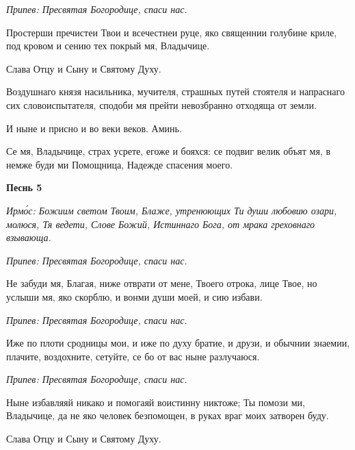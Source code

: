  \itshape Припев:\normalfont{} Пресвятая Богородице, спаси нас.



   Простерши пречистеи Твои и всечестнеи руце, яко священнии голубине
криле, под кровом и сению тех покрый мя, Владычице.



   Слава Отцу и Сыну и Святому Духу.



   Воздушнаго князя насильника, мучителя, страшных путей стоятеля и
напраснаго сих словоиспытателя, сподоби мя прейти невозбранно отходяща
от земли.



   И ныне и присно и во веки веков. Аминь.



   Се мя, Владычице, страх усрете, егоже и бояхся: се подвиг велик объят
мя, в немже буди ми Помощница, Надежде спасения моего.




 

\bfseries Песнь 5\normalfont{}


 \itshape Ирмо́с:\normalfont{} Божиим светом Твоим, Блаже, утренюющих Ти души любовию озари,
молюся, Тя ведети, Слове Божий, Истиннаго Бога, от мрака греховнаго
взывающа.



 \itshape Припев:\normalfont{} Пресвятая Богородице, спаси нас.



   Не забуди мя, Благая, ниже отврати от мене, Твоего отрока, лице Твое,
но услыши мя, яко скорблю, и вонми души моей, и сию избави.



 \itshape Припев:\normalfont{} Пресвятая Богородице, спаси нас.



   Иже по плоти сродницы мои, и иже по духу братие, и друзи, и
обычнии знаемии, плачите, воздохните, сетуйте, се бо от вас ныне
разлучаюся.



 \itshape Припев:\normalfont{} Пресвятая Богородице, спаси нас.



   Ныне избавляяй никако и помогаяй воистинну никтоже; Ты помози ми,
Владычице, да не яко человек безпомощен, в руках враг моих затворен
буду.



   Слава Отцу и Сыну и Святому Духу.



